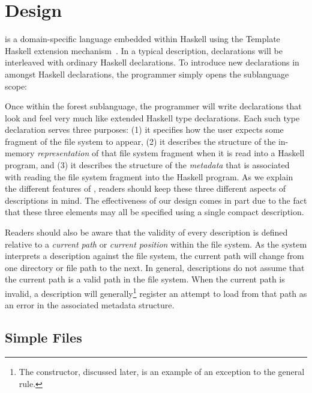 \section{\forest{} Design}
\label{sec:language}

\forest{} is a domain-specific language embedded within Haskell using the
Template Haskell extension mechanism~\cite{metahaskell}.  In a typical
\forest{} description, \forest{} declarations will be interleaved with ordinary
Haskell declarations.  To introduce new \forest{} declarations in amongst
Haskell declarations,
the programmer simply opens the \forest{} sublanguage scope:
\begin{code}
\end{code}

Once within the forest sublanguage, the programmer will write declarations
that look and feel very much like extended Haskell type declarations.
Each such type declaration serves three purposes: (1) it specifies how the user
expects some fragment of the file system to appear, (2) it describes
the structure of the in-memory {\em representation} of that 
file system fragment when it is read into a Haskell program, and (3) it describes 
the structure of the {\em metadata} that is associated with reading the file system
fragment into the Haskell program.  As we explain the different features of \forest{}, 
readers should keep these three different aspects of \forest{} descriptions in mind.  
The effectiveness of our design comes in part due to the fact that these three 
elements may all be specified using a single compact description.  

Readers should also be aware
that the validity of every description is defined relative to a 
{\em current path} or {\em current position} within the file system.  As 
the system interprets a description against the file system, the current path
will change from one directory or file path to the next.  In general, descriptions
do not assume that the current path is a valid path in the file system.  When the current
path is invalid, a description will generally\footnote{The  constructor,
discussed later, is an example of an exception to the general rule.} 
register an attempt to load from that
path as an error in the associated metadata structure.

\subsection{Simple Files}
\label{sec:basics}

